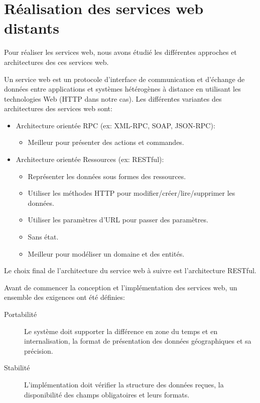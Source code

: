 \section{Réalisation des services web distants}

Pour réaliser les services web, nous avons étudié les différentes approches et
architectures des ces services web.

Un service web est un protocole d'interface de communication et d'échange de
données entre applications et systèmes hétérogènes à distance en utilisant les
technologies Web (HTTP dans notre cas). Les différentes variantes des
architectures des services web sont:

\begin{itemize}
    \item Architecture orientée RPC (ex: XML-RPC, SOAP, JSON-RPC):
        \begin{itemize}
            \item Meilleur pour présenter des actions et commandes.
        \end{itemize}
    \item Architecture orientée Ressources (ex: RESTful):
        \begin{itemize}
            \item Représenter les données sous formes des ressources.
            \item Utiliser les méthodes HTTP pour modifier/créer/lire/supprimer
                les données.
            \item Utiliser les paramètres d'URL pour passer des paramètres.
            \item Sans état.
            \item Meilleur pour modéliser un domaine et des entités.
        \end{itemize}
\end{itemize}

Le choix final de l'architecture du service web à suivre est l'architecture
RESTful.

Avant de commencer la conception et l'implémentation des services web, un
ensemble des exigences ont été définies:

\begin{description}
    \item [Portabilité] Le système doit supporter la différence en zone du temps
        et en internalisation, la format de présentation des données
        géographiques et sa précision.
    \item [Stabilité] L'implémentation doit vérifier la structure des données
        reçues, la disponibilité des champs obligatoires et leurs formats.
\end{description}

